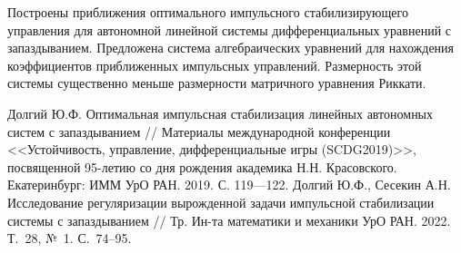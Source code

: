 Построены  приближения   оптимального импульсного стабилизирующего управления для  автономной линейной системы дифференциальных уравнений с запаздыванием.  Предложена система алгебраических уравнений для нахождения коэффициентов  приближенных импульсных управлений. Размерность этой системы существенно меньше размерности матричного уравнения Риккати.






\begin{thebibliography}{99}
Долгий Ю.Ф. { Оптимальная импульсная стабилизация линейных автономных систем с запаздыванием} // Материалы международной конференции <<Устойчивость, управление, дифференциальные игры (SCDG2019)>>, посвященной 95-летию со дня рождения академика Н.Н. Красовского. Екатеринбург: ИММ УрО РАН. 2019. С.  119—122.
Долгий Ю.Ф., Сесекин А.Н.  { Исследование регуляризации вырожденной задачи импульсной стабилизации системы с запаздыванием} // Тр. Ин-та математики и механики УрО РАН. 2022. Т.~28, №~1. С.~74--95.
\end{thebibliography}






%

